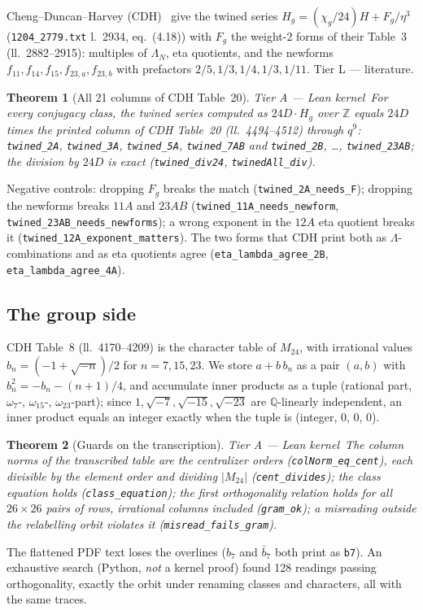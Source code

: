 \documentclass[11pt,a4paper]{article}
\newtheorem{theorem}{Theorem}[section]
\theoremstyle{remark}
\newcommand{\tierA}{\colorbox{green!15}{\textsf{\scriptsize Tier A --- Lean kernel}}}
\newcommand{\tierL}{\colorbox{blue!10}{\textsf{\scriptsize Tier L --- literature}}}
\newcommand{\lean}[1]{\texttt{#1}}
\newcommand{\Mtf}{M_{24}}
\begin{document}
Cheng--Duncan--Harvey (CDH)~\cite{CDH2012} give the twined series $H_g=(\chi_g/24)H+F_g/\eta^3$
(\texttt{1204\_2779.txt} l.~2934, eq.~(4.18)) with $F_g$ the weight-2 forms of their Table~3
(ll.~2882--2915): multiples of $\Lambda_N$, eta quotients, and the newforms
$f_{11},f_{14},f_{15},f_{23,a},f_{23,b}$ with prefactors $2/5,1/3,1/4,1/3,1/11$. \tierL.

\begin{theorem}[All 21 columns of CDH Table~20] \tierA\
For every conjugacy class, the twined series computed as $24D\cdot H_g$ over $\mathbb{Z}$ equals $24D$
times the printed column of CDH Table~20 (ll.~4494--4512) through $q^9$: \lean{twined\_2A},
\lean{twined\_3A}, \lean{twined\_5A}, \lean{twined\_7AB} and \lean{twined\_2B}, \dots,
\lean{twined\_23AB}; the division by $24D$ is exact (\lean{twined\_div24}, \lean{twinedAll\_div}).
\end{theorem}
Negative controls: dropping $F_g$ breaks the match (\lean{twined\_2A\_needs\_F}); dropping the newforms
breaks $11A$ and $23AB$ (\lean{twined\_11A\_needs\_newform}, \lean{twined\_23AB\_needs\_newforms}); a
wrong exponent in the $12A$ eta quotient breaks it (\lean{twined\_12A\_exponent\_matters}). The two
forms that CDH print both as $\Lambda$-combinations and as eta quotients agree
(\lean{eta\_lambda\_agree\_2B}, \lean{eta\_lambda\_agree\_4A}).

\subsection{The group side}
CDH Table~8 (ll.~4170--4209) is the character table of $\Mtf$, with irrational values
$b_n=(-1+\sqrt{-n})/2$ for $n=7,15,23$. We store $a+b\,b_n$ as a pair $(a,b)$ with $b_n^2=-b_n-(n+1)/4$,
and accumulate inner products as a tuple (rational part, $\omega_7$-, $\omega_{15}$-, $\omega_{23}$-part);
since $1,\sqrt{-7},\sqrt{-15},\sqrt{-23}$ are $\mathbb{Q}$-linearly independent, an inner product equals
an integer exactly when the tuple is (integer, 0, 0, 0).

\begin{theorem}[Guards on the transcription] \tierA\
The column norms of the transcribed table are the centralizer orders (\lean{colNorm\_eq\_cent}), each
divisible by the element order and dividing $|\Mtf|$ (\lean{cent\_divides}); the class equation holds
(\lean{class\_equation}); the first orthogonality relation holds for all $26\times26$ pairs of rows,
irrational columns included (\lean{gram\_ok}); a misreading outside the relabelling orbit violates it
(\lean{misread\_fails\_gram}).
\end{theorem}
The flattened PDF text loses the overlines ($b_7$ and $\bar b_7$ both print as \texttt{b7}). An
exhaustive search (Python, \emph{not} a kernel proof) found 128 readings passing orthogonality, exactly
the orbit under renaming classes and characters, all with the same traces.
\end{document}
